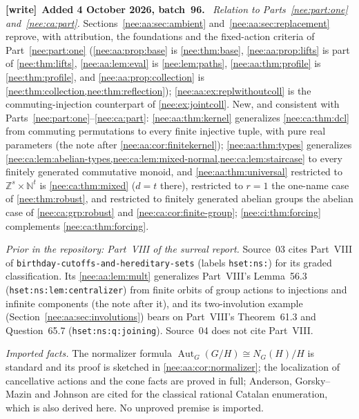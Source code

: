 \documentclass[11pt,letterpaper]{article}
\numberwithin{equation}{section}
\theoremstyle{plain}
\theoremstyle{definition}
\theoremstyle{remark}
\newcommand{\NN}{\mathbb N}
\newcommand{\ZZ}{\mathbb Z}
\newcommand{\Aut}{\operatorname{Aut}}
\newenvironment{writenote}[1][]{\par\smallskip\begingroup\small\raggedright
 \setlength{\parindent}{1.25em}\noindent\textbf{[write]}\if\relax\detokenize{#1}\relax\else~\textbf{#1.}\fi\ }%
 {\par\endgroup\smallskip}
\begin{document}
\begin{writenote}[Added 4 October 2026, batch~96]
\emph{Relation to Parts~\ref{nee:part:one} and~\ref{nee:ca:part}.} Sections~\ref{nee:aa:sec:ambient} and~\ref{nee:aa:sec:replacement} reprove, with attribution, the foundations and the fixed-action criteria of Part~\ref{nee:part:one} (\cref{nee:aa:prop:base} is \cref{nee:thm:base}, \cref{nee:aa:prop:lifts} is part of \cref{nee:thm:lifts}, \cref{nee:aa:lem:eval} is \cref{nee:lem:paths}, \cref{nee:aa:thm:profile} is \cref{nee:thm:profile}, and \cref{nee:aa:prop:collection} is \cref{nee:thm:collection,nee:thm:reflection}); \cref{nee:aa:ex:replwithoutcoll} is the commuting-injection counterpart of \cref{nee:ex:jointcoll}. New, and consistent with Parts~\ref{nee:part:one}--\ref{nee:ca:part}: \cref{nee:aa:thm:kernel} generalizes \cref{nee:ca:thm:dcl} from commuting permutations to every finite injective tuple, with pure real parameters (the note after \cref{nee:aa:cor:finitekernel}); \cref{nee:aa:thm:types} generalizes \cref{nee:ca:lem:abelian-types,nee:ca:lem:mixed-normal,nee:ca:lem:staircase} to every finitely generated commutative monoid, and \cref{nee:aa:thm:universal} restricted to $\ZZ^s\times\NN^t$ is \cref{nee:ca:thm:mixed} ($d=t$ there), restricted to $r=1$ the one-name case of \cref{nee:thm:robust}, and restricted to finitely generated abelian groups the abelian case of \cref{nee:ca:grp:robust} and \cref{nee:ca:cor:finite-group}; \cref{nee:ci:thm:forcing} complements \cref{nee:ca:thm:forcing}.

\emph{Prior in the repository: Part~VIII of the surreal report.} Source~03 cites Part~VIII of \nolinkurl{birthday-cutoffs-and-hereditary-sets} (labels \texttt{hset:ns:}) for its graded classification. Its \cref{nee:aa:lem:mult} generalizes Part~VIII's Lemma~56.3 (\texttt{hset:ns:lem:centralizer}) from finite orbits of group actions to injections and infinite components (the note after it), and its two-involution example (Section~\ref{nee:aa:sec:involutions}) bears on Part~VIII's Theorem~61.3 and Question~65.7 (\texttt{hset:ns:q:joining}). Source~04 does not cite Part~VIII.

\emph{Imported facts.} The normalizer formula $\Aut_G(G/H)\cong N_G(H)/H$ \cite{Boardman} is standard and its proof is sketched in \cref{nee:aa:cor:normalizer}; the localization of cancellative actions \cite{BaileyRenshaw,ChanLevine} and the cone facts \cite{Koch} are proved in full; Anderson, Gorsky--Mazin and Johnson \cite{Anderson,GorskyMazin,Johnson} are cited for the classical rational Catalan enumeration, which is also derived here. No unproved premise is imported.


\end{writenote}
\end{document}
